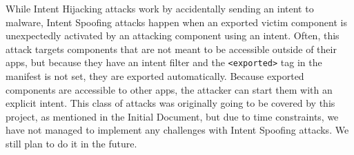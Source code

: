     While Intent Hijacking attacks work by accidentally sending an intent to malware, Intent Spoofing attacks happen when an exported victim component is unexpectedly activated by an attacking component using an intent. Often, this attack targets components that are not meant to be accessible outside of their apps, but because they have an intent filter and the \lstinline|<exported>| tag in the manifest is not set, they are exported automatically. Because exported components are accessible to other apps, the attacker can start them with an explicit intent. This class of attacks was originally going to be covered by this project, as mentioned in the Initial Document, but due to time constraints, we have not managed to implement any challenges with Intent Spoofing attacks. We still plan to do it in the future.
    